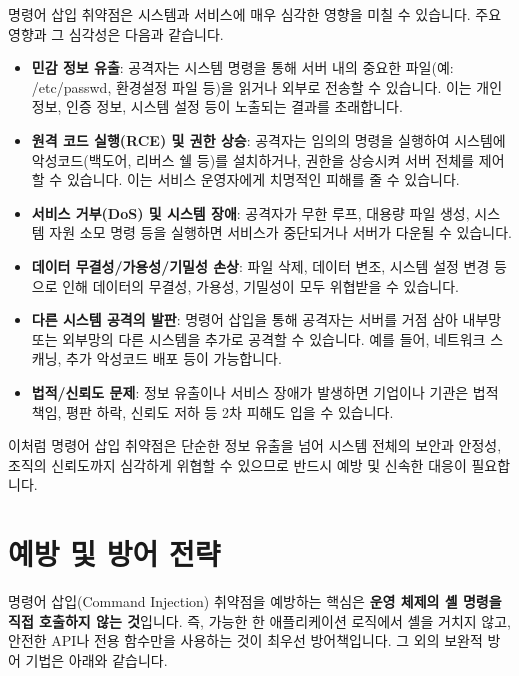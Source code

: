\documentclass{article}
\begin{document}
명령어 삽입 취약점은 시스템과 서비스에 매우 심각한 영향을 미칠 수 있습니다. 주요 영향과 그 심각성은 다음과 같습니다.

\begin{itemize}
  \item \textbf{민감 정보 유출}: 공격자는 시스템 명령을 통해 서버 내의 중요한 파일(예: /etc/passwd, 환경설정 파일 등)을 읽거나 외부로 전송할 수 있습니다. 이는 개인정보, 인증 정보, 시스템 설정 등이 노출되는 결과를 초래합니다.
  \item \textbf{원격 코드 실행(RCE) 및 권한 상승}: 공격자는 임의의 명령을 실행하여 시스템에 악성코드(백도어, 리버스 쉘 등)를 설치하거나, 권한을 상승시켜 서버 전체를 제어할 수 있습니다. 이는 서비스 운영자에게 치명적인 피해를 줄 수 있습니다.
  \item \textbf{서비스 거부(DoS) 및 시스템 장애}: 공격자가 무한 루프, 대용량 파일 생성, 시스템 자원 소모 명령 등을 실행하면 서비스가 중단되거나 서버가 다운될 수 있습니다.
  \item \textbf{데이터 무결성/가용성/기밀성 손상}: 파일 삭제, 데이터 변조, 시스템 설정 변경 등으로 인해 데이터의 무결성, 가용성, 기밀성이 모두 위협받을 수 있습니다.
  \item \textbf{다른 시스템 공격의 발판}: 명령어 삽입을 통해 공격자는 서버를 거점 삼아 내부망 또는 외부망의 다른 시스템을 추가로 공격할 수 있습니다. 예를 들어, 네트워크 스캐닝, 추가 악성코드 배포 등이 가능합니다.
  \item \textbf{법적/신뢰도 문제}: 정보 유출이나 서비스 장애가 발생하면 기업이나 기관은 법적 책임, 평판 하락, 신뢰도 저하 등 2차 피해도 입을 수 있습니다.
\end{itemize}

이처럼 명령어 삽입 취약점은 단순한 정보 유출을 넘어 시스템 전체의 보안과 안정성, 조직의 신뢰도까지 심각하게 위협할 수 있으므로 반드시 예방 및 신속한 대응이 필요합니다.

\section*{예방 및 방어 전략}
명령어 삽입(Command Injection) 취약점을 예방하는 핵심은 \textbf{운영 체제의 셸 명령을 직접 호출하지 않는 것}입니다.  
즉, 가능한 한 애플리케이션 로직에서 셸을 거치지 않고, 안전한 API나 전용 함수만을 사용하는 것이 최우선 방어책입니다.  
그 외의 보완적 방어 기법은 아래와 같습니다.
\end{document}
